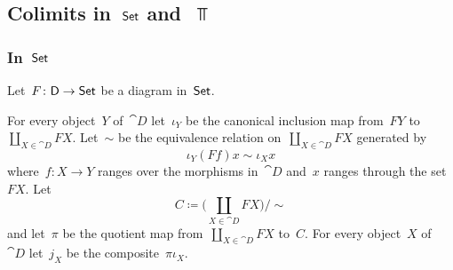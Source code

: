 \subsection{Colimits in~\texorpdfstring{$\mathsf{Set}$}{Set} and~\texorpdfstring{$\Top$}{Top}}



\subsubsection{In~\texorpdfstring{$\mathsf{Set}$}{Set}}

Let~$F \colon \mathsf{D} \to \mathsf{Set}$ be a diagram in~$\mathsf{Set}$.

For every object~$Y$ of~$\cat{D}$ let~$ι_Y$ be the canonical inclusion map from~$F Y$ to~$∐_{X ∈ \cat{D}} F X$.
Let~$∼$ be the equivalence relation on~$∐_{X ∈ \cat{D}} F X$ generated by
\[
	ι_Y (F f) x ∼ ι_X x
\]
where~$f \colon X \to Y$ ranges over the morphisms in~$\cat{D}$ and~$x$ ranges through the set~$F X$.
Let
\[
	C ≔ \Biggl( ∐_{X ∈ \cat{D}} F X \Biggr) \bigg/ {\sim}
\]
and let~$π$ be the quotient map from~$∐_{X ∈ \cat{D}} F X$ to~$C$.
For every object~$X$ of~$\cat{D}$ let~$j_X$ be the composite~$π ι_X$.

